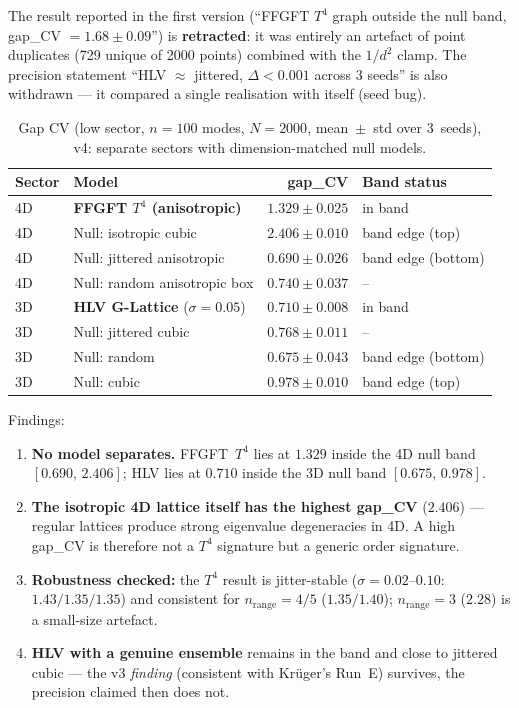 \begin{remark}
The result reported in the first version
(\enquote{FFGFT $T^4$ graph outside the null band,
gap\_CV $=1.68\pm0.09$}) is \textbf{retracted}: it was entirely an
artefact of point duplicates (729 unique of 2000 points) combined with
the $1/d^2$ clamp. The precision statement
\enquote{HLV $\approx$ jittered, $\Delta<0.001$ across 3 seeds} is
also withdrawn --- it compared a single realisation with itself
(seed bug).
\end{remark}

\begin{table}[ht]
\centering
\caption{Gap CV (low sector, $n{=}100$ modes, $N{=}2000$,
mean~$\pm$~std over 3~seeds), v4: separate sectors with
dimension-matched null models.}
\label{tab:gap275env4}
\begin{tabular}{@{}llrl@{}}
\toprule
Sector & Model & gap\_CV & Band status \\
\midrule
4D & \textbf{FFGFT $T^4$ (anisotropic)} & $1.329\pm0.025$ & in band \\
4D & Null: isotropic cubic              & $2.406\pm0.010$ & band edge (top) \\
4D & Null: jittered anisotropic         & $0.690\pm0.026$ & band edge (bottom) \\
4D & Null: random anisotropic box       & $0.740\pm0.037$ & -- \\
\midrule
3D & \textbf{HLV G-Lattice} ($\sigma{=}0.05$) & $0.710\pm0.008$ & in band \\
3D & Null: jittered cubic               & $0.768\pm0.011$ & -- \\
3D & Null: random                       & $0.675\pm0.043$ & band edge (bottom) \\
3D & Null: cubic                        & $0.978\pm0.010$ & band edge (top) \\
\bottomrule
\end{tabular}
\end{table}

Findings:

\begin{enumerate}
  \item \textbf{No model separates.} FFGFT~$T^4$ lies at $1.329$
        inside the 4D null band $[0.690,\,2.406]$; HLV lies at $0.710$
        inside the 3D null band $[0.675,\,0.978]$.
  \item \textbf{The isotropic 4D lattice itself has the highest
        gap\_CV} ($2.406$) --- regular lattices produce strong
        eigenvalue degeneracies in 4D. A high gap\_CV is therefore not
        a $T^4$ signature but a generic order signature.
  \item \textbf{Robustness checked:} the $T^4$ result is
        jitter-stable ($\sigma=0.02$--$0.10$: $1.43/1.35/1.35$) and
        consistent for $n_\mathrm{range}=4/5$ ($1.35/1.40$);
        $n_\mathrm{range}=3$ ($2.28$) is a small-size artefact.
  \item \textbf{HLV with a genuine ensemble} remains in the band and
        close to jittered cubic --- the v3 \emph{finding} (consistent
        with Krüger's Run~E) survives, the precision claimed then does
        not.
\end{enumerate}

